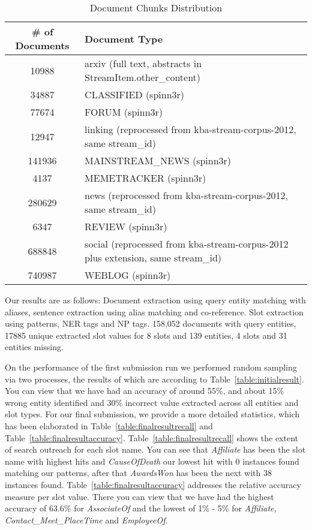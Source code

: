  
\begin{table}[b]
\caption{Document Chunks Distribution }
\centering
\label{table:documentsDist}

\begin{tabular}{|c|l|}
\hline 
\textbf{\# of Documents} & \textbf{Document Type}\\ 
\hline 
10988 & 	arxiv (full text, abstracts in StreamItem.other\_content) \\ \hline
34887 & CLASSIFIED (spinn3r)  \\ \hline
77674 & FORUM (spinn3r)  \\ \hline
12947 & linking (reprocessed from kba-stream-corpus-2012, same stream\_id)  \\ \hline
141936 & MAINSTREAM\_NEWS (spinn3r)  \\ \hline
4137 & MEMETRACKER (spinn3r)  \\ \hline
280629 & news (reprocessed from kba-stream-corpus-2012, same stream\_id)  \\ \hline
6347 &  REVIEW (spinn3r) \\ \hline
688848 & 	 social (reprocessed from kba-stream-corpus-2012 plus extension, same stream\_id)  \\ \hline
740987 & WEBLOG (spinn3r)  \\ \hline

  
\hline 
\end{tabular} 
\end{table}


 
 
 
 Our results are as follows: Document extraction using query entity matching with aliases, sentence 
extraction using alias matching and co-reference. Slot extraction using 
patterns, NER tags and NP tags. 158,052 documents with query entities, 17885 
unique extracted slot values for 8 slots and 139 entities, 4 slots and 31 
entities missing.

On the performance of the first submission run we performed random 
sampling via two processes, the results of which are according to
Table~\ref{table:initialresult}. You can view that we have had an accuracy of
around 55\%, and about 15\% wrong entity identified and 30\% incorrect value
extracted across all entities and slot types. For our final submission, we
provide a more detailed statistics, which has been elaborated in
Table~\ref{table:finalresultrecall} and Table~\ref{table:finalresultaccuracy}.
Table~\ref{table:finalresultrecall} shows the extent of search outreach for
each slot name. You can see that \textit{Affiliate} has been the slot name with
highest hits and \textit{CauseOfDeath} our lowest hit with 0 instances found
matching our patterns, after that \textit{AwardsWon} has been the next with 38
instances found. Table~\ref{table:finalresultaccuracy} addresses the relative
accuracy measure per slot value. There you can view that we have had the
highest accuracy of 63.6\% for \textit{AssociateOf} and the lowest of
1\% - 5\%  for \textit{Affiliate}, \textit{Contact\_Meet\_PlaceTime} and \textit{EmployeeOf}.

